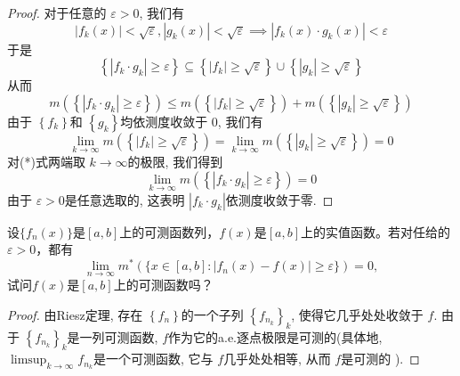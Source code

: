 \documentclass[../main.tex]{subfiles}
\begin{document}
\begin{proof}
    对于任意的 \(   \varepsilon > 0  \), 我们有 \[
    \left| f_{k}\left( x \right)  \right|< \sqrt{ \varepsilon }, \left| g_{k}\left( x \right) \right|< \sqrt{ \varepsilon } \implies \left| f_{k}\left( x \right)\cdot g_{k}\left( x \right)   \right|   <  \varepsilon 
    \]于是 \[
    \left\{ \left| f_{k}\cdot g_{k} \right|\ge  \varepsilon   \right\}\subseteq \left\{ \left| f_{k} \right|\ge \sqrt{ \varepsilon }  \right\}\cup \left\{ \left| g_{k} \right|\ge \sqrt{ \varepsilon }  \right\}
    \]从而 \[
    m\left( \left\{ \left| f_{k}\cdot g_{k} \right|\ge  \varepsilon   \right\} \right)\le m\left(\left\{  \left| f_{k} \right|\ge \sqrt{ \varepsilon }  \right\} \right)  + m\left(\left\{  \left| g_{k} \right|\ge \sqrt{ \varepsilon }  \right\} \right)  \tag{*}
    \]由于 \(  \left\{ f_{k} \right\}  \)和 \(  \left\{ g_{k} \right\}  \)均依测度收敛于  \(  0  \), 我们有 \[
    \lim_{k\to \infty}m\left( \left\{ \left| f_{k} \right|\ge \sqrt{ \varepsilon }  \right\} \right)= \lim_{k\to \infty}m\left( \left\{ \left| g_{k} \right|\ge \sqrt{ \varepsilon }  \right\} \right)= 0  
    \] 对(*)式两端取 \(  k\to \infty  \)的极限, 我们得到 \[
   \lim_{k\to \infty} m\left( \left\{ \left| f_{k}\cdot g_{k} \right|\ge  \varepsilon   \right\} \right)= 0 
    \]由于 \(   \varepsilon > 0  \)是任意选取的, 这表明 \(  \left| f_{k}\cdot g_{k} \right|   \)依测度收敛于零.   
\end{proof}
\begin{exercise}{}{}
    设\(\{f_n(x)\}\)是\([a,b]\)上的可测函数列，\(f(x)\)是\([a,b]\)上的实值函数。若对任给的\(\varepsilon>0\)，都有
\[
\lim_{n\to\infty}m^*(\{x\in[a,b]: |f_n(x)-f(x)|\geq\varepsilon\})=0,
\]
试问\(f(x)\)是\([a,b]\)上的可测函数吗？
\end{exercise}

\begin{proof}
    由Riesz定理, 存在 \(  \left\{ f_{n} \right\}  \)的一个子列 \(  \left\{ f_{n_{k}} \right\}_{k}  \), 使得它几乎处处收敛于 \(  f  \). 由于 \(  \left\{ f_{n_{k}} \right\}_{k}  \)是一列可测函数, \(  f  \)作为它的a.e.逐点极限是可测的(具体地,  \(  \limsup_{k\to \infty}f_{n_{k}}  \)是一个可测函数, 它与 \(  f  \)几乎处处相等, 从而 \(  f  \)是可测的   ).  
\end{proof}
\end{document}

